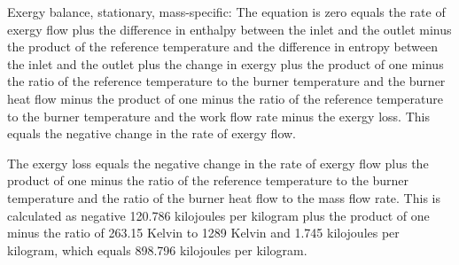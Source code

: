 Exergy balance, stationary, mass-specific:
The equation is zero equals the rate of exergy flow plus the difference in enthalpy between the inlet and the outlet minus the product of the reference temperature and the difference in entropy between the inlet and the outlet plus the change in exergy plus the product of one minus the ratio of the reference temperature to the burner temperature and the burner heat flow minus the product of one minus the ratio of the reference temperature to the burner temperature and the work flow rate minus the exergy loss. This equals the negative change in the rate of exergy flow.

The exergy loss equals the negative change in the rate of exergy flow plus the product of one minus the ratio of the reference temperature to the burner temperature and the ratio of the burner heat flow to the mass flow rate. This is calculated as negative 120.786 kilojoules per kilogram plus the product of one minus the ratio of 263.15 Kelvin to 1289 Kelvin and 1.745 kilojoules per kilogram, which equals 898.796 kilojoules per kilogram.